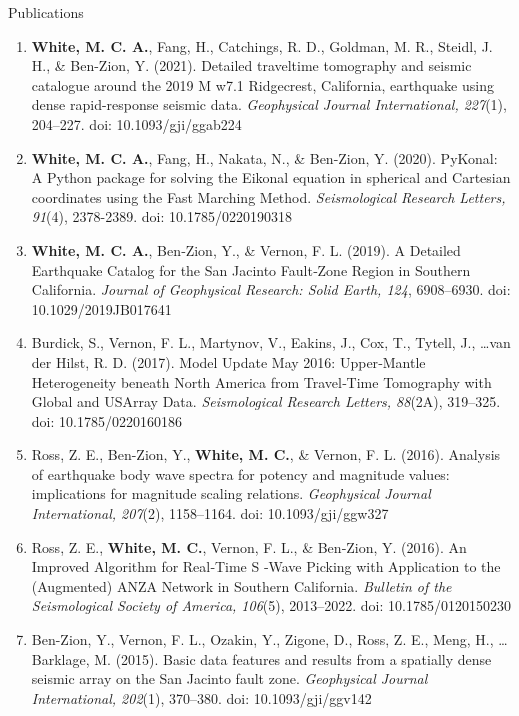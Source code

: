 \begin{rSection}{Publications}
\begin{enumerate}
		\item \textbf{White, M. C. A.}, Fang, H., Catchings, R. D., Goldman, M. R., Steidl, J. H., \& Ben-Zion, Y. (2021). Detailed traveltime tomography and seismic catalogue around the 2019 M w7.1 Ridgecrest, California, earthquake using dense rapid-response seismic data. \textit{Geophysical Journal International, 227}(1), 204–227. doi: 10.1093/gji/ggab224
		
		\item \textbf{White, M. C. A.}, Fang, H., Nakata, N., \& Ben-Zion, Y. (2020). PyKonal: A Python package for solving the Eikonal equation in spherical and Cartesian coordinates using the Fast Marching Method. \textit{Seismological Research Letters,  91}(4), 2378-2389. doi: 10.1785/0220190318
		
		\item \textbf{White, M. C. A.}, Ben‐Zion, Y., \& Vernon, F. L. (2019). A Detailed Earthquake Catalog for the San Jacinto Fault‐Zone Region in Southern California. \textit{Journal of Geophysical Research: Solid Earth, 124}, 6908–6930. doi: 10.1029/2019JB017641
		
		\item Burdick, S., Vernon, F. L., Martynov, V., Eakins, J., Cox, T., Tytell, J., \dots van der Hilst, R. D. (2017). Model Update May 2016: Upper‐Mantle Heterogeneity beneath North America from Travel‐Time Tomography with Global and USArray Data. \textit{Seismological Research Letters, 88}(2A), 319–325. doi: 10.1785/0220160186
		
		\item Ross, Z. E., Ben-Zion, Y., \textbf{White, M. C.}, \& Vernon, F. L. (2016). Analysis of earthquake body wave spectra for potency and magnitude values: implications for magnitude scaling relations. \textit{Geophysical Journal International, 207}(2), 1158–1164. doi: 10.1093/gji/ggw327
		
		\item Ross, Z. E., \textbf{White, M. C.}, Vernon, F. L., \& Ben‐Zion, Y. (2016). An Improved Algorithm for Real‐Time S ‐Wave Picking with Application to the (Augmented) ANZA Network in Southern California. \textit{Bulletin of the Seismological Society of America, 106}(5), 2013–2022. doi: 10.1785/0120150230
		
		\item Ben-Zion, Y., Vernon, F. L., Ozakin, Y., Zigone, D., Ross, Z. E., Meng, H., \dots Barklage, M. (2015). Basic data features and results from a spatially dense seismic array on the San Jacinto fault zone. \textit{Geophysical Journal International, 202}(1), 370–380. doi: 10.1093/gji/ggv142
		

\end{enumerate}
\end{rSection}
